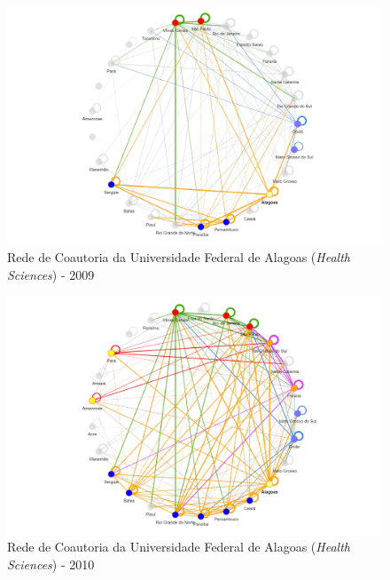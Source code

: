 \begin{figure}[H]
	\centering
	\includegraphics[scale=0.6]{Imagens/rede-al-2009.pdf}
	\caption{Rede de Coautoria da Universidade Federal de Alagoas (\textit{Health Sciences}) - 2009}
	\label{Rede de Coautoria - UF AL 2009}
\end{figure}

\begin{figure}[H]
	\centering
	\includegraphics[scale=0.6]{Imagens/rede-al-2010.pdf}
	\caption{Rede de Coautoria da Universidade Federal de Alagoas (\textit{Health Sciences}) - 2010}
	\label{Rede de Coautoria - UF AL 2010}
\end{figure}

